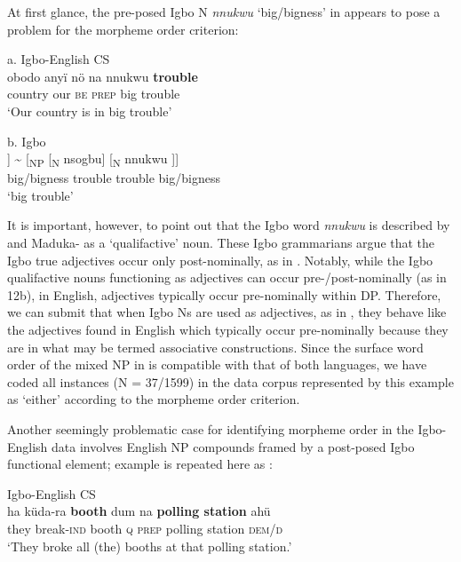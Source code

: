\documentclass[output=paper]{langsci/langscibook}
\begin{document}
At first glance, the pre-posed Igbo N \textit{nnukwu }‘big/bigness’ in  appears to pose a problem for the morpheme order criterion:

\ea
{a. Igbo-English CS}\\
\gll obodo  anyï  nö    na  nnukwu  \textbf{trouble}\\
     country  our    \textsc{be}\textsubscript{  }\textsc{prep} big     trouble\\
\glt ‘Our country is in big trouble’
\z

\ea
{b. Igbo }\\
\gll [\textsubscript{NP}\textsuperscript{ }[\textsubscript{N }nnukwu]  [\textsubscript{N }nsogbu]] {\textasciitilde} [\textsubscript{NP }[\textsubscript{N  }nsogbu] [\textsubscript{N }nnukwu\textsubscript{ }]]  \\
              big/bigness  trouble                  trouble       big/bigness    \\
\glt ‘big trouble’
\z

It is important, however, to point out that the Igbo word \textit{nnukwu }is described by \citet[47-8]{Emenanjo1978} and Maduka-\citet[237]{Durunze1990} as a ‘qualifactive’ noun. These Igbo grammarians argue that the Igbo true adjectives occur only post-nominally, as in . Notably, while the Igbo qualifactive nouns functioning as adjectives can occur pre-/post-nominally (as in 12b), in English, adjectives typically occur pre-nominally within DP. Therefore, we can submit that when Igbo Ns are used as adjectives, as in , they behave like the adjectives found in English which typically occur pre-nominally because they are in what may be termed associative constructions. Since the surface word order of the mixed NP in  is compatible with that of both languages, we have coded all instances (N = 37/1599) in the data corpus represented by this example as ‘either’ according to the morpheme order criterion. 

Another seemingly problematic case for identifying morpheme order in the Igbo-English data involves English NP compounds framed by a post-posed Igbo functional element; example  is repeated here as :

\ea
{Igbo-English CS}\\
\gll ha    küda-ra  \textbf{booth }dum   na    \textbf{polling station }ahü\\
     they break-\textsc{ind}  booth  \textsc{q}  \textsc{prep}  polling station   \textsc{dem/d}\\
\glt ‘They broke all (the) booths at that polling station.’ \textsubscript{ } 
\z
\end{document}
